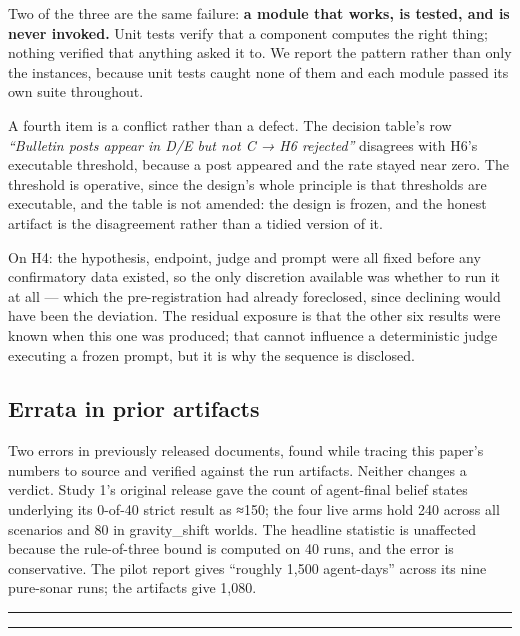 \documentclass[pdflatex,sn-basic]{sn-jnl}
\begin{document}
Two of the three are the same failure: \textbf{a module that works, is tested, and is never invoked.}
Unit tests verify that a component computes the right thing; nothing verified that anything asked
it to. We report the pattern rather than only the instances, because unit tests caught none of
them and each module passed its own suite throughout.

A fourth item is a conflict rather than a defect. The decision table's row \emph{``Bulletin posts appear
in D/E but not C → H6 rejected''} disagrees with H6's executable threshold, because a post appeared
and the rate stayed near zero. The threshold is operative, since the design's whole principle is
that thresholds are executable, and the table is not amended: the design is frozen, and the honest
artifact is the disagreement rather than a tidied version of it.

On H4: the hypothesis, endpoint, judge and prompt were all fixed before any confirmatory
data existed, so the only discretion available was whether to run it at all --- which the
pre-registration had already foreclosed, since declining would have been the deviation.
The residual exposure is that the other six results were known when this one was produced;
that cannot influence a deterministic judge executing a frozen prompt, but it is why the
sequence is disclosed.

\hypertarget{errata-in-prior-artifacts}{%
\subsection{Errata in prior artifacts}\label{errata-in-prior-artifacts}}

Two errors in previously released documents, found while tracing
this paper's numbers to source and verified against the run artifacts. Neither changes a verdict.
Study 1's original release gave the count of agent-final belief states underlying its
0-of-40 strict result as ≈150; the four live arms hold 240 across all scenarios and 80 in
gravity\_shift worlds. The headline statistic is unaffected
because the rule-of-three bound is computed on 40 runs, and the error is conservative. The pilot
report gives ``roughly 1,500 agent-days'' across its nine pure-sonar runs; the artifacts give
1,080.

\begin{center}\rule{0.5\linewidth}{0.5pt}\end{center}

\begin{center}\rule{0.5\linewidth}{0.5pt}\end{center}
\end{document}
